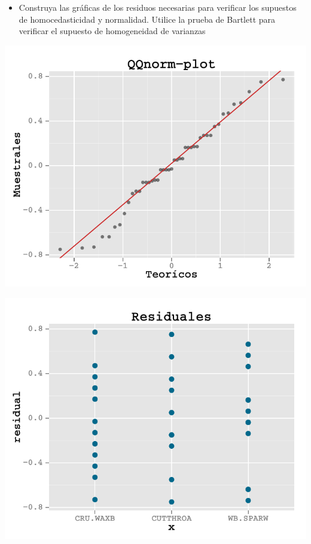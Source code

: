 \documentclass[a4paper]{scrartcl}\usepackage[]{graphicx}\usepackage[]{color}
\makeatletter
\def\maxwidth{ %
  \ifdim\Gin@nat@width>\linewidth
    \linewidth
  \else
    \Gin@nat@width
  \fi
}
\newenvironment{knitrout}{}{} %
\makeatother
\begin{document}
\begin{itemize}
\begin{itemize}
\begin{itemize}
\begin{itemize}
\begin{knitrout}
\end{knitrout}

\begin{itemize}
  \item Construya las gráficas de los residuos necesarias para verificar los supuestos de homocedasticidad y normalidad. Utilice la prueba de Bartlett para verificar el supuesto de homogeneidad de varianzas 
\end{itemize}

\begin{knitrout}
\color{fgcolor}

{\centering \includegraphics[width=\maxwidth]{figure/unnamed-chunk-281} 

}




{\centering \includegraphics[width=\maxwidth]{figure/unnamed-chunk-282} 

}
\end{knitrout}
\end{itemize}
\end{itemize}
\end{itemize}
\end{itemize}
\end{document}
